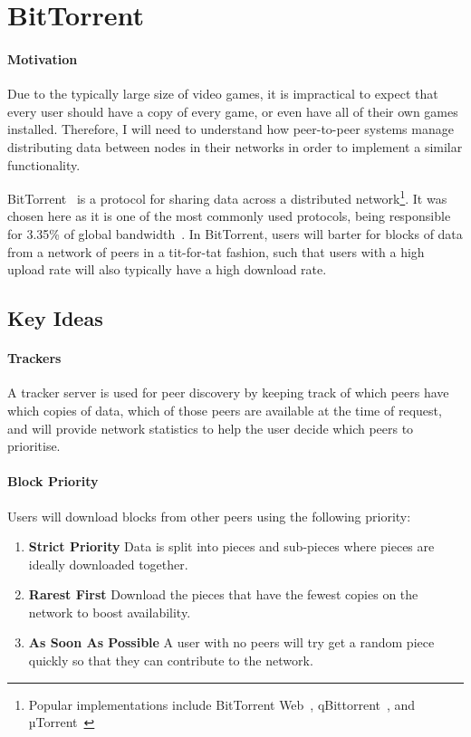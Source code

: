 
\section{BitTorrent}\label{sec:bittorrent}

\paragraph*{Motivation}
Due to the typically large size of video games, it is impractical to expect that every user should have a copy of every game, or even have all of their own games installed. Therefore, I will need to understand how peer-to-peer systems manage distributing data between nodes in their networks in order to implement a similar functionality.

\newparagraph
BitTorrent~\cite{kaune_unraveling_2010, pouwelse_bittorrent_2005} is a protocol for sharing data across a distributed network\footnote{Popular implementations include BitTorrent Web~\cite{inc_bittorrent_nodate}, qBittorrent~\cite{noauthor_qbittorrent_nodate}, and µTorrent~\cite{inc_torrent_nodate}}. 
It was chosen here as it is one of the most commonly used protocols, being responsible for 3.35\% of global bandwidth~\cite{noauthor_application_nodate}. 
In BitTorrent, users will barter for blocks of data from a network of peers in a tit-for-tat fashion, such that users with a high upload rate will also typically have a high download rate.

\subsection*{Key Ideas}

\paragraph*{Trackers}
A tracker server is used for peer discovery by keeping track of which peers have which copies of data, which of those peers are available at the time of request, and will provide network statistics to help the user decide which peers to prioritise.

\paragraph*{Block Priority}
Users will download blocks from other peers using the following priority:
\begin{enumerate}
  \item \textbf{Strict Priority} Data is split into pieces and sub-pieces where pieces are ideally downloaded together.
  \item \textbf{Rarest First} Download the pieces that have the fewest copies on the network to boost availability.
  \item \textbf{As Soon As Possible} A user with no peers will try get a random piece quickly so that they can contribute to the network. 
\end{enumerate}

